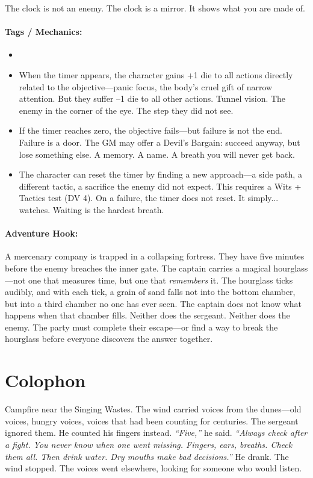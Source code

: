 The clock is not an enemy. The clock is a mirror. It shows what you are made of.

\paragraph{Tags / Mechanics:}
\begin{itemize}
\item [PRESSURE] [DREAD] [TRUTH]
\item When the timer appears, the character gains +1 die to all actions directly related to the objective—panic focus, the body's cruel gift of narrow attention. But they suffer --1 die to all other actions. Tunnel vision. The enemy in the corner of the eye. The step they did not see.
\item If the timer reaches zero, the objective fails—but failure is not the end. Failure is a door. The GM may offer a Devil's Bargain: succeed anyway, but lose something else. A memory. A name. A breath you will never get back.
\item The character can reset the timer by finding a new approach—a side path, a different tactic, a sacrifice the enemy did not expect. This requires a Wits + Tactics test (DV 4). On a failure, the timer does not reset. It simply... watches. Waiting is the hardest breath.
\end{itemize}

\paragraph{Adventure Hook:}
A mercenary company is trapped in a collapsing fortress. They have five minutes before the enemy breaches the inner gate. The captain carries a magical hourglass—not one that measures time, but one that \textit{remembers} it. The hourglass ticks audibly, and with each tick, a grain of sand falls not into the bottom chamber, but into a third chamber no one has ever seen. The captain does not know what happens when that chamber fills. Neither does the sergeant. Neither does the enemy. The party must complete their escape—or find a way to break the hourglass before everyone discovers the answer together.

\section*{Colophon}
Campfire near the Singing Wastes. The wind carried voices from the dunes—old voices, hungry voices, voices that had been counting for centuries. The sergeant ignored them. He counted his fingers instead. \textit{``Five,''} he said. \textit{``Always check after a fight. You never know when one went missing. Fingers, ears, breaths. Check them all. Then drink water. Dry mouths make bad decisions.''} He drank. The wind stopped. The voices went elsewhere, looking for someone who would listen.